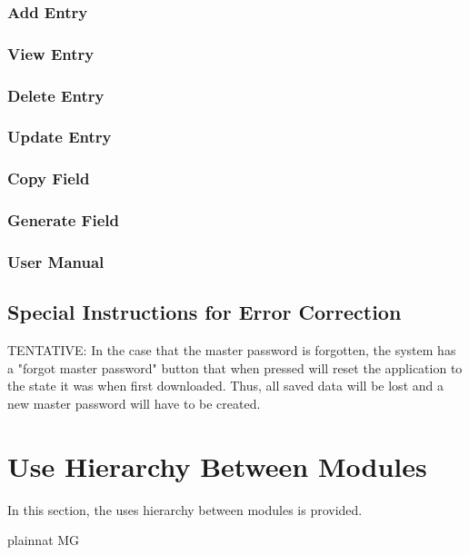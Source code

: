 \documentclass[12pt, titlepage]{article}
\begin{document}
\subsubsection{Add Entry} \label{AddEnt}

\subsubsection{View Entry} \label{ViewEnt}

\subsubsection{Delete Entry} \label{DelEnt}

\subsubsection{Update Entry} \label{UpdateEnt}

\subsubsection{Copy Field} \label{CopyField}

\subsubsection{Generate Field} \label{GenField}

\subsubsection{User Manual} \label{UseMan}


\subsection{Special Instructions for Error Correction} \label{ErrCorr}

TENTATIVE: In the case that the master password is forgotten, the system has a "forgot master password" button that when pressed will reset the application to the state it was when first downloaded. Thus, all saved data will be lost and a new master password will have to be created.


\section{Use Hierarchy Between Modules} \label{SecUse}

In this section, the uses hierarchy between modules is
provided. \citet{Parnas1978} 



 {plainnat}
 {MG}
\end{document}
